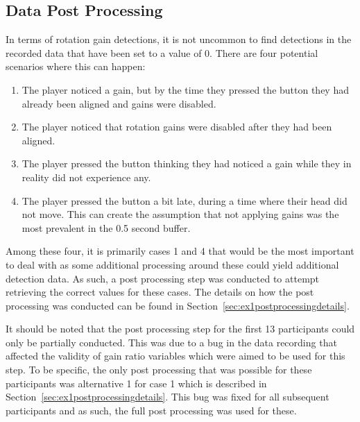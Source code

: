 \subsection{Data Post Processing}\label{sec:ex1postprocessing}
In terms of rotation gain detections, it is not uncommon to find detections in the recorded data that have been set to a value of 0. There are four potential scenarios where this can happen:
\begin{enumerate}
    \item The player noticed a gain, but by the time they pressed the button they had already been aligned and gains were disabled.
    \item The player noticed that rotation gains were disabled after they had been aligned. 
    \item The player pressed the button thinking they had noticed a gain while they in reality did not experience any.
    \item The player pressed the button a bit late, during a time where their head did not move. This can create the assumption that not applying gains was the most prevalent in the 0.5 second buffer.  
\end{enumerate}

Among these four, it is primarily cases 1 and 4 that would be the most important to deal with as some additional processing around these could yield additional detection data. As such, a post processing step was conducted to attempt retrieving the correct values for these cases. The details on how the post processing was conducted can be found in Section~\ref{sec:ex1postprocessingdetails}. 

It should be noted that the post processing step for the first 13 participants could only be partially conducted. This was due to a bug in the data recording that affected the validity of gain ratio variables which were aimed to be used for this step. To be specific, the only post processing that was possible for these participants was alternative 1 for case 1 which is described in Section~\ref{sec:ex1postprocessingdetails}. This bug was fixed for all subsequent participants and as such, the full post processing was used for these. 


   

